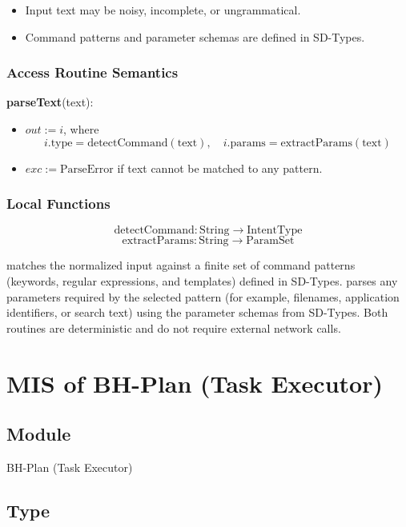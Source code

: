 \documentclass[12pt, titlepage]{article}
\begin{document}
\begin{itemize}
  \item Input text may be noisy, incomplete, or ungrammatical.
  \item Command patterns and parameter schemas are defined in SD-Types.
\end{itemize}

\subsubsection{Access Routine Semantics}

\noindent
\textbf{parseText}(text):
\begin{itemize}
  \item $out := i$, where
  \[
    i.\text{type} = \text{detectCommand}(\text{text}), \quad
    i.\text{params} = \text{extractParams}(\text{text})
  \]
  \item $exc := \text{ParseError}$ if text cannot be matched to any pattern.
\end{itemize}

\subsubsection{Local Functions}

\[
  \text{detectCommand} : \text{String} \rightarrow \text{IntentType}
\]
\[
  \text{extractParams} : \text{String} \rightarrow \text{ParamSet}
\]

\noindent
{} matches the normalized input against a finite set of
command patterns (keywords, regular expressions, and templates) defined in
SD-Types.  parses any parameters required by the selected
pattern (for example, filenames, application identifiers, or search text) using
the parameter schemas from SD-Types. Both routines are deterministic and do not
require external network calls.

\section{MIS of BH-Plan (Task Executor)} \label{mod:BHPlan}

\subsection{Module}

BH-Plan (Task Executor)

\subsection{Type}
\end{document}
